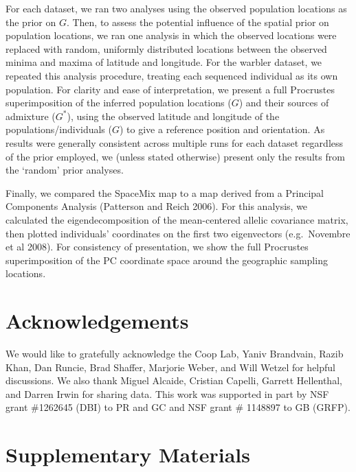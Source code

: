 \documentclass[12pt]{article}
\newcommand{\identifyadmixsource}[1]{{#1^{*}}}
\begin{document}
For each dataset, we ran two analyses using the observed population locations as the prior on $G$.  
Then, to assess the potential influence of the spatial prior on population locations, 
we ran one analysis in which the observed locations
were replaced with random, uniformly distributed locations between the observed minima and maxima of latitude and longitude.
For the warbler dataset, we repeated this analysis procedure, treating each sequenced individual as its own population.  
For clarity and ease of interpretation, we present a full Procrustes superimposition of the inferred population locations ($G$) 
and their sources of admixture ($\identifyadmixsource{G}$), 
using the observed latitude and longitude of the populations/individuals ($G$) to give a reference position and orientation.  
As results were generally consistent across multiple runs for each dataset regardless of the prior employed, 
we (unless stated otherwise) present only the results from the `random' prior analyses.

Finally, we compared the SpaceMix map to a map derived from a Principal Components Analysis (Patterson and Reich 2006).  For this analysis, we calculated the eigendecomposition of the mean-centered allelic covariance matrix, then plotted individuals' coordinates on the first two eigenvectors (e.g.\ Novembre et al 2008).  For consistency of presentation, we show the full Procrustes superimposition of the PC coordinate space around the geographic sampling locations.



\section*{Acknowledgements}
We would like to gratefully acknowledge the Coop Lab, Yaniv Brandvain, Razib Khan, Dan Runcie, Brad Shaffer, Marjorie Weber, and Will Wetzel for helpful discussions.  
We also thank Miguel Alcaide, Cristian Capelli, Garrett Hellenthal, and Darren Irwin for sharing data.
This work was supported in part by NSF grant \#1262645 (DBI) to PR and GC and NSF grant \# 1148897 to GB (GRFP).


\newpage



\newpage



\section*{Supplementary Materials}
\renewcommand{\thefigure}{S\arabic{figure}}
\setcounter{figure}{0}
\renewcommand{\thetable}{S\arabic{table}}
\setcounter{table}{0}
\renewcommand{\theequation}{S\arabic{table}}
\setcounter{equation}{0}
\end{document}
